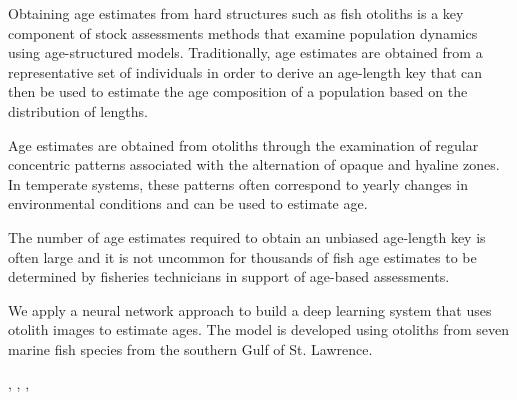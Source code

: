 Obtaining age estimates from hard structures such as fish otoliths is a key component of stock assessments methods that examine population dynamics using age-structured models. Traditionally, age estimates are obtained from a representative set of individuals in order to derive an age-length key that can then be used to estimate the age composition of a population based on the distribution of lengths.

Age estimates are obtained from otoliths through the examination of regular concentric patterns associated with the alternation of opaque and hyaline zones. In temperate systems, these patterns often correspond to yearly changes in environmental conditions and can be used to estimate age.

The number of age estimates required to obtain an unbiased age-length key is often large and it is not uncommon for thousands of fish age estimates to be determined by fisheries technicians in support of age-based assessments. 

We apply a neural network approach to build a deep learning system that uses otolith images to estimate ages. The model is developed using otoliths from seven marine fish species from the southern Gulf of St. Lawrence. 


\cite{moen-2018}, \cite{polacek-2023}, \cite{politikos-2021}, \cite{sigurdardottir-2023}
 
